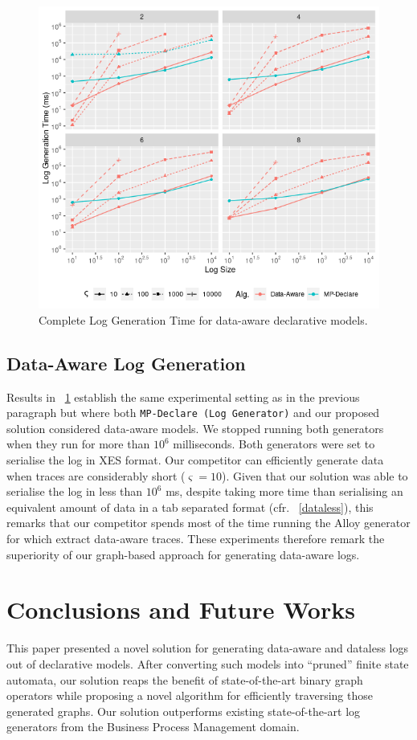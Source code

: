 \documentclass[sigconf]{acmart}
\begin{document}
\begin{figure}[!t]
\centering
\includegraphics[width=\linewidth]{fig/Datamer.png}
\caption{Complete Log Generation Time for data-aware declarative models.}\label{dataware}
\end{figure}
\subsection{Data-Aware Log Generation}\label{ssec:dataaware}
Results in \figurename~\ref{dataware} establish the same experimental setting as in the previous paragraph but where both \texttt{MP-Declare (Log Generator)} and our proposed solution considered data-aware models. We stopped running both generators when they run for more than $10^6$ milliseconds. Both generators were set to serialise the log in XES format. Our competitor can efficiently generate data when traces are considerably short ($\varsigma=10$). Given that our solution was able to serialise the log in less than $10^6$ ms, despite taking more time than serialising an equivalent amount of data in a tab separated format (cfr. \figurename~\ref{dataless}), this remarks that our competitor spends most of the time running the Alloy generator for which extract data-aware traces. These experiments therefore remark the superiority of our graph-based approach for generating data-aware logs.

\section{Conclusions and Future Works}\label{sec:conclfut}
This paper presented a novel solution for generating data-aware and dataless logs out of declarative models. After converting such models into ``pruned'' finite state automata, our solution reaps the benefit of state-of-the-art binary graph operators while proposing a novel algorithm for efficiently traversing those generated graphs. Our solution outperforms existing state-of-the-art log generators from the Business Process Management domain.
\end{document}
